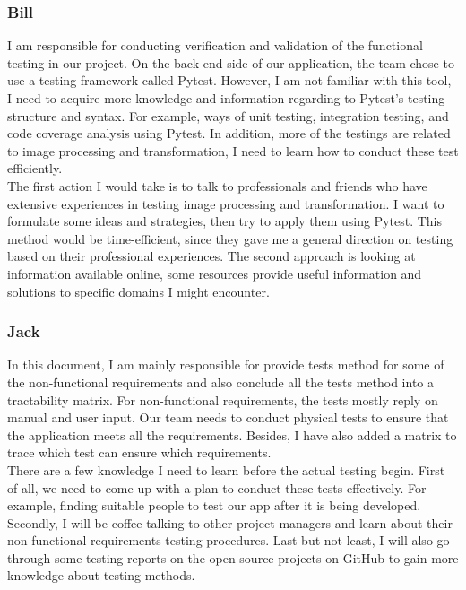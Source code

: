 \documentclass[12pt, titlepage]{article}
\begin{document}
\subsubsection{Bill}
I am responsible for conducting verification and validation of the functional testing in our project. On the back-end side of our application, the team chose to use a testing framework called Pytest. However, I am not familiar with this tool, I need to acquire more knowledge and information regarding to Pytest's testing structure and syntax. For example, ways of unit testing, integration testing, and code coverage analysis using Pytest. In addition, more of the testings are related to image processing and transformation, I need to learn how to conduct these test efficiently.\\
\newline
The first action I would take is to talk to professionals and friends who have extensive experiences in testing image processing and transformation. I want to formulate some ideas and strategies, then try to apply them using Pytest. This method would be time-efficient, since they gave me a general direction on testing based on their professional experiences. The second approach is looking at information available online, some resources provide useful information and solutions to specific domains I might encounter.
\medskip

\subsubsection{Jack}
In this document, I am mainly responsible for provide tests method for some of the non-functional requirements and also conclude all the tests method into a tractability matrix. For non-functional requirements, the tests mostly reply on manual and user input. Our team needs to conduct physical tests to ensure that the application meets all the requirements. Besides, I have also added a matrix to trace which test can ensure which requirements.\\

\newline
There are a few knowledge I need to learn before the actual testing begin. First of all, we need to come up with a plan to conduct these tests effectively. For example, finding suitable people to test our app after it is being developed. Secondly, I will be coffee talking to other project managers and learn about their non-functional requirements testing procedures. Last but not least, I will also go through some testing reports on the open source projects on GitHub to gain more knowledge about testing methods.
\end{document}
